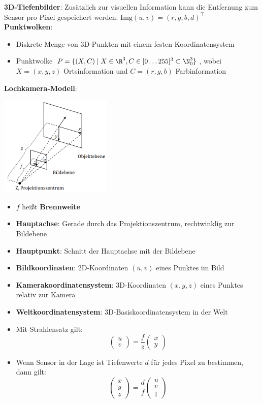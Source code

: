 \textbf{3D-Tiefenbilder}: Zusätzlich zur visuellen Information kann die Entfernung zum Sensor pro Pixel gespeichert werden: $\text{Img}(u,v)=(r,g,b,d)^\top$\\

\textbf{Punktwolken}:
\begin{itemize}
	\item Diskrete Menge von 3D-Punkten mit einem festen Koordinatensystem
	\item Punktwolke $P=\{(X,C)\mid X\in\R^3, C\in [0\ldots 255]^3\subset \N_0^3\}$, wobei $X=(x,y,z)$ Ortsinformation und $C = (r,g,b)$ Farbinformation
\end{itemize}
\bigskip
\textbf{Lochkamera-Modell}:
\begin{center}
	\includegraphics[width=0.4\textwidth]{images/lochkamera.png}
\end{center}
\begin{itemize}
	\item $f$ heißt \textbf{Brennweite}
	\item \textbf{Hauptachse}: Gerade durch das Projektionszentrum, rechtwinklig zur Bildebene
	\item \textbf{Hauptpunkt}: Schnitt der Hauptachse mit der Bildebene
	\item \textbf{Bildkoordinaten}: 2D-Koordinaten $(u,v)$ eines Punktes im Bild
	\item \textbf{Kamerakoordinatensystem}: 3D-Koordinaten $(x,y,z)$ eines Punktes relativ zur Kamera
	\item \textbf{Weltkoordinatensystem}: 3D-Basiskoordinatensystem in der Welt
	\item Mit Strahlensatz gilt:
	$$\left(
	\begin{matrix}
		u \\
		v
	\end{matrix}\right)=\frac{f}{z}\left(
	\begin{matrix}
	x \\
	y
	\end{matrix}\right)$$
	\item Wenn Sensor in der Lage ist Tiefenwerte $d$ für jedes Pixel zu bestimmen, dann gilt: $$\left(
	\begin{matrix}
		x \\
		y \\
		z
	\end{matrix}\right)=\frac{d}{f}\left(
	\begin{matrix}
		u \\
		v \\
		1
	\end{matrix}\right)$$
\end{itemize}
